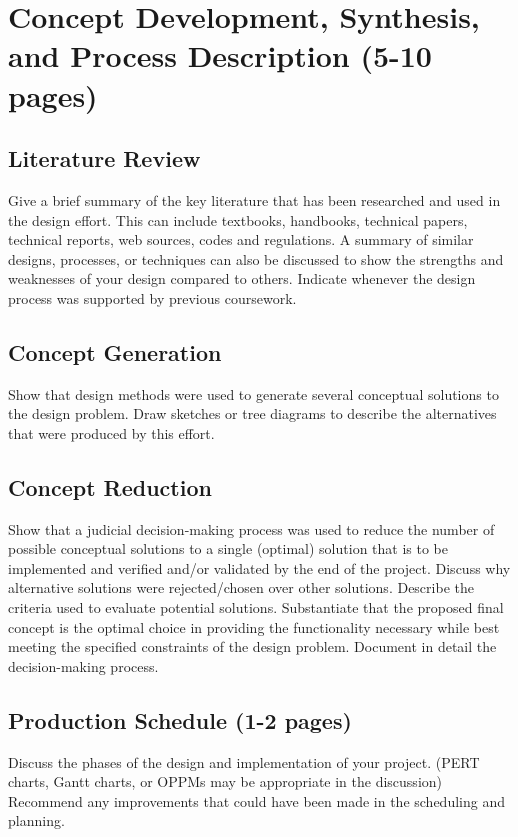\documentclass[12pt]{article}
\begin{document}
\section{Concept Development, Synthesis, and Process Description (5-10 pages)}
\subsection{Literature Review}
Give a brief summary of the key literature that has been researched and used in the design effort. This can include textbooks, handbooks, technical papers, technical reports, web sources, codes and regulations. A summary of similar designs, processes, or techniques can also be discussed to show the strengths and weaknesses of your design compared to others. Indicate whenever the design process was supported by previous coursework.

\subsection{Concept Generation}
Show that design methods were used to generate several conceptual solutions to the design problem. Draw sketches or tree diagrams to describe the alternatives that were produced by this effort.

\subsection{Concept Reduction}
Show that a judicial decision-making process was used to reduce the number of possible conceptual solutions to a single (optimal) solution that is to be implemented and verified and/or validated by the end of the project. Discuss why alternative solutions were rejected/chosen over other solutions. Describe the criteria used to evaluate potential solutions. Substantiate that the proposed final concept is the optimal choice in providing the functionality necessary while best meeting the specified constraints of the design problem. Document in detail the decision-making process.

\subsection{Production Schedule (1-2 pages)}
Discuss the phases of the design and implementation of your project. (PERT charts, Gantt charts, or OPPMs may be appropriate in the discussion) Recommend any improvements that could have been made in the scheduling and planning.
\end{document}
